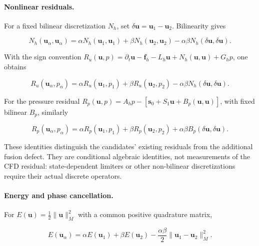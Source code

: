 \documentclass{article}
\providecommand{\DIFaddtex}[1]{{\protect\color{blue} \sf #1}} %
\providecommand{\DIFadd}[1]{\texorpdfstring{\DIFaddtex{#1}}{#1}} %
\begin{document}
\paragraph{\DIFadd{Nonlinear residuals.}}
\DIFadd{For a fixed bilinear discretization $N_h$, set $\delta\bm u=\bm u_1-\bm u_2$. Bilinearity gives
}



{\color{blue}
\begin{equation}
N_h(\bm u_\alpha,\bm u_\alpha)
=\alpha N_h(\bm u_1,\bm u_1)+\beta N_h(\bm u_2,\bm u_2)
-\alpha\beta N_h(\delta\bm u,\delta\bm u).
\end{equation}
}



\DIFadd{With the sign convention
$R_u(\bm u,p)=\partial_t\bm u-\bm f_h-L_h\bm u+N_h(\bm u,\bm u)+G_hp$, one obtains
}



{\color{blue}
\begin{equation}
R_u(\bm u_\alpha,p_\alpha)
=\alpha R_u(\bm u_1,p_1)+\beta R_u(\bm u_2,p_2)
-\alpha\beta N_h(\delta\bm u,\delta\bm u).
\end{equation}
}



\DIFadd{For the pressure residual
$R_p(\bm u,p)=A_hp-[\bm s_0+S_1\bm u+B_p(\bm u,\bm u)]$, with fixed bilinear $B_p$, similarly
}



{\color{blue}
\begin{equation}
R_p(\bm u_\alpha,p_\alpha)
=\alpha R_p(\bm u_1,p_1)+\beta R_p(\bm u_2,p_2)
+\alpha\beta B_p(\delta\bm u,\delta\bm u).
\end{equation}
}



\DIFadd{These identities distinguish the candidates' existing residuals from the additional fusion defect. They are conditional algebraic identities, not measurements of the CFD residual: state-dependent limiters or other non-bilinear discretizations require their actual discrete operators.
}

\paragraph{\DIFadd{Energy and phase cancellation.}}
\DIFadd{For $E(\bm u)=\tfrac12\|\bm u\|_M^2$ with a common positive quadrature matrix,
}



{\color{blue}
\begin{equation}
E(\bm u_\alpha)=\alpha E(\bm u_1)+\beta E(\bm u_2)
-\frac{\alpha\beta}{2}\|\bm u_1-\bm u_2\|_M^2.
\end{equation}
}
\end{document}
